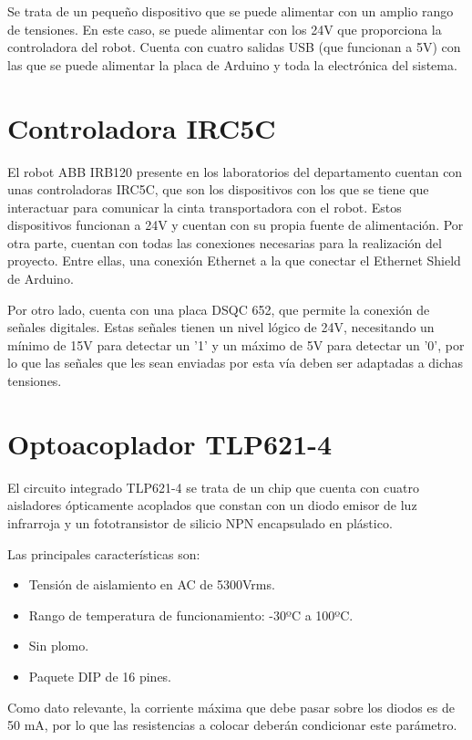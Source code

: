 Se trata de un pequeño dispositivo que se puede alimentar con un amplio rango de tensiones. En este caso,
se puede alimentar con los 24V que proporciona la controladora del robot. Cuenta con cuatro salidas USB 
(que funcionan a 5V) con las que se puede alimentar la placa de Arduino y toda la electrónica del sistema.

\section{Controladora IRC5C}

El robot ABB IRB120 presente en los laboratorios del departamento cuentan con unas controladoras IRC5C,
que son los dispositivos con los que se tiene que interactuar para comunicar la cinta transportadora con
el robot. Estos dispositivos funcionan a 24V y cuentan con su propia fuente de alimentación. Por otra parte,
cuentan con todas las conexiones necesarias para la realización del proyecto. Entre ellas, una conexión Ethernet
a la que conectar el Ethernet Shield de Arduino.

Por otro lado, cuenta con una placa DSQC 652, que permite la conexión de señales digitales. Estas señales tienen
un nivel lógico de 24V, necesitando un mínimo de 15V para detectar un '1' y un máximo de 5V para detectar un '0',
por lo que las señales que les sean enviadas por esta vía deben ser adaptadas a dichas tensiones.

\section{Optoacoplador TLP621-4}

El circuito integrado TLP621-4 se trata de un chip que cuenta con cuatro aisladores ópticamente acoplados que constan
con un diodo emisor de luz infrarroja y un fototransistor de silicio NPN encapsulado en plástico.

Las principales características son:
\begin{itemize}
    \item Tensión de aislamiento en AC de 5300Vrms.
    \item Rango de temperatura de funcionamiento: -30ºC a 100ºC.
    \item Sin plomo.
    \item Paquete DIP de 16 pines.
\end{itemize}

Como dato relevante, la corriente máxima que debe pasar sobre los diodos es de 50 mA, por lo que las
resistencias a colocar deberán condicionar este parámetro.